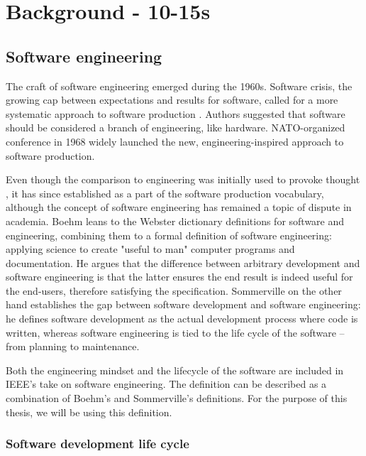 \chapter{Background - 10-15s}

\section{Software engineering}

The craft of software engineering emerged during the 1960s. Software crisis, the growing cap between expectations and results for software, called for a more systematic approach to software production \cite{mcclure_nato_1968}. Authors suggested that software should be considered a branch of engineering, like hardware. NATO-organized conference in 1968 widely launched the new, engineering-inspired approach to software production.

Even though the comparison to engineering was initially used to provoke thought \cite{mcclure_nato_1968}, it has since established as a part of the software production vocabulary, although the concept of software engineering has remained a topic of dispute in academia. Boehm \cite{boehm_software_1979} leans to the Webster dictionary definitions for software and engineering, combining them to a formal definition of software engineering: applying science to create "useful to man" computer programs and documentation. He argues that the difference between arbitrary development and software engineering is that the latter ensures the end result is indeed useful for the end-users, therefore satisfying the specification.  Sommerville on the other hand establishes the gap between software development and software engineering: he defines software development as the actual development process where code is written, whereas software engineering is tied to the life cycle of the software – from planning to maintenance. \cite{sommerville_software_2016}

Both the engineering mindset and the lifecycle of the software are included in IEEE's take on software engineering. The definition can be described as a combination of Boehm's and Sommerville's definitions. For the purpose of this thesis, we will be using this definition. \cite{noauthor_ieee_1990}

\subsection{Software development life cycle}

